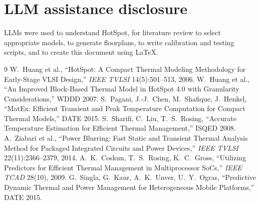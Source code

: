 \documentclass[11pt,a4paper]{article}
\begin{document}
\section{LLM assistance disclosure}
LLMs were used to understand HotSpot, for literature review to select appropriate models, to
generate floorplans, to write calibration and testing scripts, and to create this document
using \LaTeX.

\begin{thebibliography}{9}\small
{} W.~Huang et al., ``HotSpot: A Compact Thermal Modeling Methodology for
  Early-Stage VLSI Design,'' \emph{IEEE TVLSI} 14(5):501--513, 2006.
 W.~Huang et al., ``An Improved Block-Based Thermal Model in HotSpot 4.0 with
  Granularity Considerations,'' WDDD 2007.
 S.~Pagani, J.-J.~Chen, M.~Shafique, J.~Henkel, ``MatEx: Efficient Transient and
  Peak Temperature Computation for Compact Thermal Models,'' DATE 2015.
 S.~Sharifi, C.~Liu, T.~S.~Rosing, ``Accurate Temperature Estimation for
  Efficient Thermal Management,'' ISQED 2008.
 A.~Ziabari et al., ``Power Blurring: Fast Static and Transient Thermal Analysis
  Method for Packaged Integrated Circuits and Power Devices,'' \emph{IEEE TVLSI} 22(11):2366--2379,
  2014.
 A.~K.~Coskun, T.~S.~Rosing, K.~C.~Gross, ``Utilizing Predictors for Efficient
  Thermal Management in Multiprocessor SoCs,'' \emph{IEEE TCAD} 28(10), 2009.
 G.~Singla, G.~Kaur, A.~K.~Unver, U.~Y.~Ogras, ``Predictive Dynamic Thermal and
  Power Management for Heterogeneous Mobile Platforms,'' DATE 2015.
\end{thebibliography}
\end{document}
